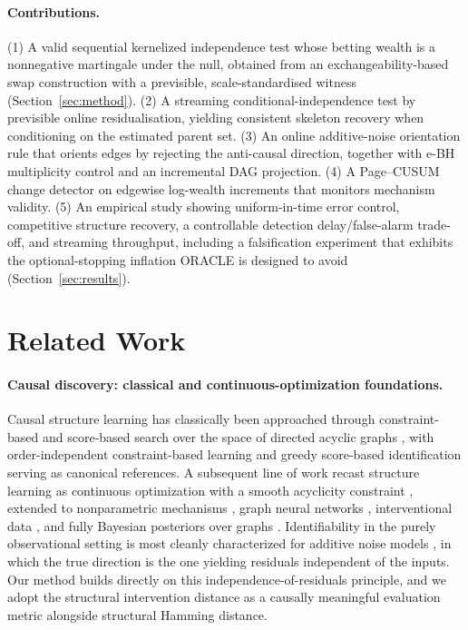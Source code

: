 \documentclass[preprint,12pt,authoryear]{elsarticle}
\begin{document}
\paragraph{Contributions.}
(1) A valid sequential kernelized independence test whose betting wealth is a
nonnegative martingale under the null, obtained from an exchangeability-based
swap construction with a previsible, scale-standardised witness
(Section~\ref{sec:method}). (2) A streaming conditional-independence test by
previsible online residualisation, yielding consistent skeleton recovery when
conditioning on the estimated parent set. (3) An online additive-noise
orientation rule that orients edges by rejecting the anti-causal direction,
together with e-BH multiplicity control and an incremental DAG projection.
(4) A Page--CUSUM change detector on edgewise log-wealth increments that
monitors mechanism validity. (5) An empirical study showing uniform-in-time
error control, competitive structure recovery, a controllable detection
delay/false-alarm trade-off, and streaming throughput, including a falsification
experiment that exhibits the optional-stopping inflation ORACLE is designed to
avoid (Section~\ref{sec:results}).

\section{Related Work}
\label{sec:related}

\paragraph{Causal discovery: classical and continuous-optimization foundations.}
Causal structure learning has classically been approached through constraint-based and score-based search over the space of directed acyclic graphs \cite{spirtes2000causation, pearl2009causality, peters2017elements}, with order-independent constraint-based learning \cite{colombo2014pcstable} and greedy score-based identification \cite{chickering2002ges} serving as canonical references. A subsequent line of work recast structure learning as continuous optimization with a smooth acyclicity constraint \cite{zheng2018notears}, extended to nonparametric mechanisms \cite{zheng2020sparsedag}, graph neural networks \cite{yu2019daggnn}, interventional data \cite{brouillard2020dcdi}, and fully Bayesian posteriors over graphs \cite{lorch2021dibs}. Identifiability in the purely observational setting is most cleanly characterized for additive noise models \cite{hoyer2008anm, peters2014canm}, in which the true direction is the one yielding residuals independent of the inputs. Our method builds directly on this independence-of-residuals principle, and we adopt the structural intervention distance \cite{peters2015sid} as a causally meaningful evaluation metric alongside structural Hamming distance.
\end{document}
